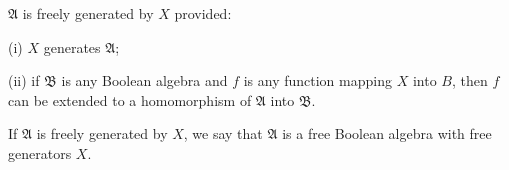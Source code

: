 $\mathfrak{A}$ is freely generated by $X$ provided:

(i) $X$ generates $\mathfrak{A}$;

(ii) if $\mathfrak{B}$ is any Boolean algebra and $f$ is any function mapping $X$ into $B$, then $f$ can be extended to a homomorphism of $\mathfrak{A}$ into $\mathfrak{B}$.

If $\mathfrak{A}$ is freely generated by $X$, we say that $\mathfrak{A}$ is a free Boolean algebra with free generators $X$.
